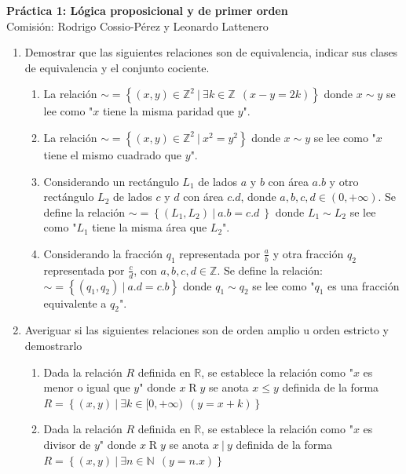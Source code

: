 \documentclass[a4paper]{article}
\newcommand{\exercise}{\item}
\begin{document}
\noindent \hrulefill 
\vspace{-7pt}
\begin{center} 
	\textbf{ Práctica 1: Lógica proposicional y de primer orden } \\
	Comisión: Rodrigo Cossio-Pérez y Leonardo Lattenero
\end{center}
\vspace{-10pt}
\hrulefill
\begin{enumerate}
	\exercise Demostrar que las siguientes relaciones son de equivalencia, indicar sus clases de equivalencia y el conjunto cociente.
	\begin{enumerate} [label=(\alph*)]
		\item La relación $ \sim = \left\lbrace (x,y) \in \mathbb{Z}^{2} ~|~ \exists k \in \mathbb{Z} ~~(x-y=2k) \right\rbrace$ donde $x \sim y$ se lee como "$x$ tiene la misma paridad que $y$".
		\item La relación $ \sim = \left\lbrace (x,y)\in \mathbb{Z}^{2} ~|~ x^{2}=y^{2} \right\rbrace$ donde $x \sim y$ se lee como "$x$ tiene el mismo cuadrado que $y$".
		\item Considerando un rectángulo $L_{1}$ de lados $a$ y $b$ con área $a.b$ y otro rectángulo $L_2$ de lados $c$ y $d$ con área $c.d$, donde $a,b,c,d \in ( 0 , +\infty)$. Se define la relación $ \sim = \left\lbrace (L_1,L_2) ~|~ a.b=c.d ~\right\rbrace$ donde $L_{1}\sim L_{2}$ se lee como "$L_{1}$ tiene la misma área que $L_{2}$".
		\item Considerando la fracción $q_1$ representada por $\displaystyle\frac{a}{b}$ y otra fracción $q_2$ representada por $\displaystyle\frac{c}{d}$, con $a,b,c,d\in\mathbb{Z}$. Se define la relación: $\sim = \left\lbrace (q_1,q_2) ~|~ a.d=c.b \right\rbrace$ donde $q_{1}\sim q_{2}$ se lee como "$q_{1}$ es una fracción equivalente a $q_{2}$".
	\end{enumerate}
	\exercise Averiguar si las siguientes relaciones son de orden amplio u orden estricto y demostrarlo
	\begin{enumerate} [label=(\alph*)]
		\item Dada la relación $R$ definida en $\mathbb{R}$, se establece la relación como "$x$ es menor o igual que $y$" donde $x\mathrel{R}y$ se anota $x\leq y$ definida de la forma $R = \left\lbrace (x,y) ~|~ \exists k \in [0,+\infty) ~~( y=x+k ) \right\rbrace$
		\item Dada la relación $R$ definida en $\mathbb{R}$, se establece la relación como "$x$ es divisor de $y$" donde $x\mathrel{R}y$ se anota $x~|~y$ definida de la forma $R = \left\lbrace (x,y) ~|~ \exists n \in \mathbb{N} ~~( y=n.x ) \right\rbrace$

\end{enumerate}
\end{enumerate}
\end{document}
